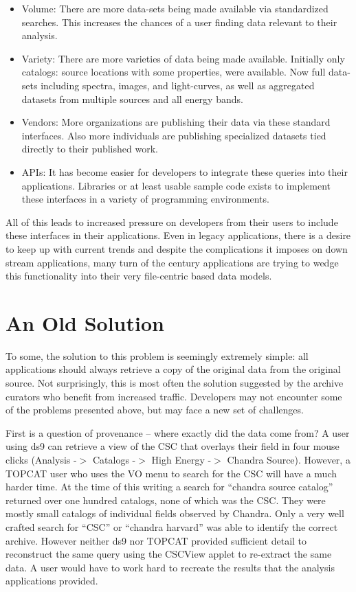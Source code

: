 \begin{itemize}

\item Volume: There are more data-sets being made available via standardized searches. This increases the chances of a user finding data relevant to their analysis. 
\item Variety:  There are more varieties of data being made available.  Initially only catalogs: source locations with some properties, were available.  Now full data-sets including spectra, images, and light-curves, as well as aggregated
datasets from multiple sources and all energy bands.
\item Vendors: More organizations are publishing their data via these 
standard interfaces.  Also more individuals are publishing specialized datasets tied directly 
to their published work.
\item APIs: It has become easier for developers to integrate these queries into their applications.  Libraries or at least usable sample code exists to implement these interfaces in a variety of programming environments.

\end{itemize}

All of this leads to increased pressure on developers  from their users to
 include these interfaces in their applications.    Even in legacy applications, there is a desire to keep up with current trends and despite the 
complications it imposes on down stream applications, many turn
of the century applications are trying to wedge this functionality into
their very file-centric based data models.



\section{An Old Solution}

To some, the solution to this problem is seemingly extremely simple:  all 
applications should always retrieve a copy of the original data from the 
original source.  Not surprisingly, this is most often the solution 
suggested by the archive curators who benefit from increased traffic. 
Developers may not encounter some of the problems presented 
above, but may face a new set of challenges.


First is a question of provenance -- where exactly did the data come from?
A user using ds9 can retrieve a view of the CSC that overlays their field in
four mouse clicks  (Analysis -$>$ Catalogs -$>$ High Energy -$>$ Chandra Source).
However, a TOPCAT user who uses the VO menu to search for the CSC will have
a much harder time.  At the time of this writing a search for
 ``chandra source catalog'' returned over one hundred catalogs, none of
which was the CSC.  They were mostly small catalogs of individual fields 
observed by Chandra.  Only a very well crafted search for ``CSC'' or ``chandra harvard'' was able to identify the correct archive.  However neither ds9
nor TOPCAT provided sufficient detail to reconstruct the same query using
the CSCView applet to re-extract the same data.  A user would have to work
hard to recreate the results that the analysis applications provided.

